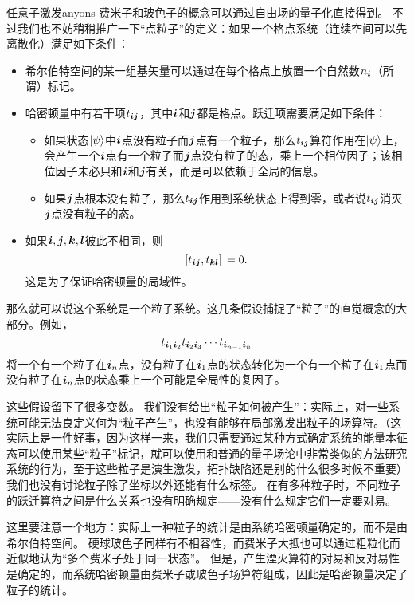 \begin{back}{任意子激发}{anyons}
    费米子和玻色子的概念可以通过自由场的量子化直接得到。
    不过我们也不妨稍稍推广一下“点粒子”的定义：如果一个格点系统（连续空间可以先离散化）满足如下条件：
    \begin{itemize}
        \item 希尔伯特空间的某一组基矢量可以通过在每个格点上放置一个自然数$n_{\vb*{i}}$（所谓）标记。
        \item 哈密顿量中有若干项$t_{\vb*{i} \vb*{j}}$，其中$\vb*{i}$和$\vb*{j}$都是格点。跃迁项需要满足如下条件：
        \begin{itemize}
            \item 如果状态$\ket{\psi}$中$\vb*{i}$点没有粒子而$\vb*{j}$点有一个粒子，那么$t_{\vb*{i} \vb*{j}}$算符作用在$\ket{\psi}$上，会产生一个$\vb*{i}$点有一个粒子而$\vb*{j}$点没有粒子的态，乘上一个相位因子；该相位因子未必只和$\vb*{i}$和$\vb*{j}$有关，而是可以依赖于全局的信息。
            \item 如果$\vb*{j}$点根本没有粒子，那么$t_{\vb*{i} \vb*{j}}$作用到系统状态上得到零，或者说$t_{\vb*{i} \vb*{j}}$消灭$\vb*{j}$点没有粒子的态。
        \end{itemize}
        \item 如果$\vb*{i}, \vb*{j}, \vb*{k}, \vb*{l}$彼此不相同，则
        \begin{equation}
            \comm*{t_{\vb*{i} \vb*{j}}}{t_{\vb*{k} \vb*{l}}} = 0.
        \end{equation}
        这是为了保证哈密顿量的局域性。
    \end{itemize}
    那么就可以说这个系统是一个粒子系统。这几条假设捕捉了“粒子”的直觉概念的大部分。例如，
    \[
        t_{\vb*{i}_1 \vb*{i}_2} t_{\vb*{i}_2 \vb*{i}_3} \cdots t_{\vb*{i}_{n-1} \vb*{i}_n} 
    \]
    将一个有一个粒子在$\vb*{i}_n$点，没有粒子在$\vb*{i}_1$点的状态转化为一个有一个粒子在$\vb*{i}_1$点而没有粒子在$\vb*{i}_n$点的状态乘上一个可能是全局性的复因子。
    
    这些假设留下了很多变数。
    我们没有给出“粒子如何被产生”：实际上，对一些系统可能无法良定义何为“粒子产生”，也没有能够在局部激发出粒子的场算符。（这实际上是一件好事，因为这样一来，我们只需要通过某种方式确定系统的能量本征态可以使用某些“粒子”标记，就可以使用和普通的量子场论中非常类似的方法研究系统的行为，至于这些粒子是演生激发，拓扑缺陷还是别的什么很多时候不重要）
    我们也没有讨论粒子除了坐标以外还能有什么标签。
    在有多种粒子时，不同粒子的跃迁算符之间是什么关系也没有明确规定——没有什么规定它们一定要对易。

    这里要注意一个地方：实际上一种粒子的统计是由系统哈密顿量确定的，而不是由希尔伯特空间。
    硬球玻色子同样有不相容性，而费米子大抵也可以通过粗粒化而近似地认为“多个费米子处于同一状态”。
    但是，产生湮灭算符的对易和反对易性是确定的，而系统哈密顿量由费米子或玻色子场算符组成，因此是哈密顿量决定了粒子的统计。
\end{back}

